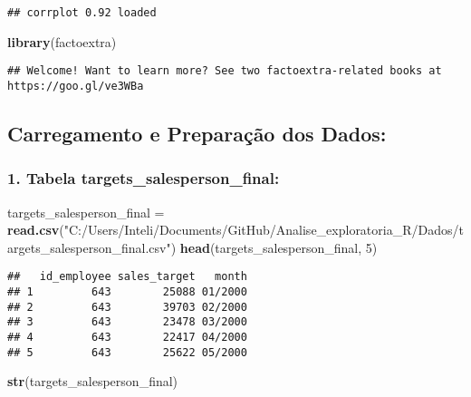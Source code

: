 \documentclass[
]{article}
\newenvironment{Shaded}{\begin{snugshade}}{\end{snugshade}}
\newcommand{\DecValTok}[1]{\textcolor[rgb]{0.00,0.00,0.81}{#1}}
\newcommand{\FunctionTok}[1]{\textcolor[rgb]{0.13,0.29,0.53}{\textbf{#1}}}
\newcommand{\NormalTok}[1]{#1}
\newcommand{\OtherTok}[1]{\textcolor[rgb]{0.56,0.35,0.01}{#1}}
\newcommand{\StringTok}[1]{\textcolor[rgb]{0.31,0.60,0.02}{#1}}
\begin{document}
\begin{verbatim}
## corrplot 0.92 loaded
\end{verbatim}

\begin{Shaded}
\begin{Highlighting}[]
\FunctionTok{library}\NormalTok{(factoextra)}
\end{Highlighting}
\end{Shaded}

\begin{verbatim}
## Welcome! Want to learn more? See two factoextra-related books at https://goo.gl/ve3WBa
\end{verbatim}

\subsection{Carregamento e Preparação dos
Dados:}\label{carregamento-e-preparauxe7uxe3o-dos-dados}

\subsubsection{1. Tabela
targets\_salesperson\_final:}\label{tabela-targets_salesperson_final}

\begin{Shaded}
\begin{Highlighting}[]
\NormalTok{targets\_salesperson\_final }\OtherTok{=} \FunctionTok{read.csv}\NormalTok{(}\StringTok{"C:/Users/Inteli/Documents/GitHub/Analise\_exploratoria\_R/Dados/targets\_salesperson\_final.csv"}\NormalTok{)}
\FunctionTok{head}\NormalTok{(targets\_salesperson\_final, }\DecValTok{5}\NormalTok{)}
\end{Highlighting}
\end{Shaded}

\begin{verbatim}
##   id_employee sales_target   month
## 1         643        25088 01/2000
## 2         643        39703 02/2000
## 3         643        23478 03/2000
## 4         643        22417 04/2000
## 5         643        25622 05/2000
\end{verbatim}

\begin{Shaded}
\begin{Highlighting}[]
\FunctionTok{str}\NormalTok{(targets\_salesperson\_final)}
\end{Highlighting}
\end{Shaded}
\end{document}
